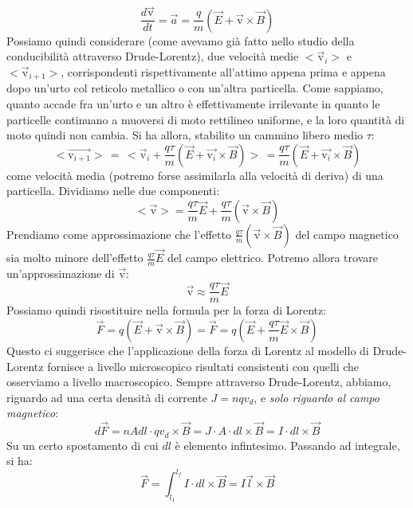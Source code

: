 \documentclass[a4paper,12pt]{article}
\begin{document}
$$ \frac{d\vec{\mathrm{v}}}{dt} = \vec{a} = \frac{q}{m}(\vec{E} + \vec{\mathrm{v}} \times \vec{B}) $$
Possiamo quindi considerare (come avevamo già fatto nello studio della conducibilità attraverso Drude-Lorentz), due velocità medie
$<\vec{\mathrm{v}}_i>$ e $<\vec{\mathrm{v}}_{i + 1}>$, corrispondenti rispettivamente all'attimo appena prima e appena dopo un'urto
col reticolo metallico o con un'altra particella. Come sappiamo, quanto accade fra un'urto e un altro è effettivamente irrilevante
in quanto le particelle continuano a muoversi di moto rettilineo uniforme, e la loro quantità di moto quindi non cambia. Si ha allora,
stabilito un cammino libero medio $\tau$:
$$ <\vec{\mathrm{v}_{i + 1}}>\, =\, < \vec{\mathrm{v}}_i + \frac{q\tau}{m}(\vec{E} + \vec{\mathrm{v}_i} \times \vec{B}) > \, =  \frac{q\tau}{m}(\vec{E} + \vec{\mathrm{v}_i} \times \vec{B}) $$
come velocità media (potremo forse assimilarla alla velocità di deriva) di una particella. Dividiamo nelle due componenti:
$$ < \vec{\mathrm{v}} > = \frac{q\tau}{m}\vec{E} + \frac{q\tau}{m}(\vec{\mathrm{v}} \times \vec{B}) $$
Prendiamo come approssimazione che l'effetto $ \frac{q\tau}{m}(\vec{\mathrm{v}} \times \vec{B}) $ del campo magnetico
sia molto minore dell'effetto $ \frac{q\tau}{m}\vec{E} $ del campo elettrico. Potremo allora trovare un'approssimazione di $\vec{\mathrm{v}}$:
$$ \vec{\mathrm{v}} \approx   \frac{q\tau}{m}\vec{E} $$
Possiamo quindi risostituire nella formula per la forza di Lorentz:
$$ \vec{F} = q(\vec{E} + \vec{\mathrm{v}} \times \vec{B}) =  \vec{F} = q(\vec{E} +  \frac{q\tau}{m}\vec{E} \times \vec{B}) $$
Questo ci suggerisce che l'applicazione della forza di Lorentz al modello di Drude-Lorentz fornisce a livello microscopico risultati
consistenti con quelli che osserviamo a livello macroscopico. Sempre attraverso Drude-Lorentz, abbiamo, riguardo ad una certa densità di corrente $J = nqv_d$, e \textit{solo riguardo al campo magnetico}:
$$ d\vec{F} = nAdl\cdot qv_d \times \vec{B} = J \cdot A \cdot dl \times \vec{B} = I \cdot dl \times \vec{B} $$
Su un certo spostamento di cui $dl$ è elemento infintesimo. Passando ad integrale, si ha:
$$ \vec{F} = \int_{l_1}^{l_f} I \cdot dl \times \vec{B} = I\vec{l} \times \vec{B} $$
\end{document}
